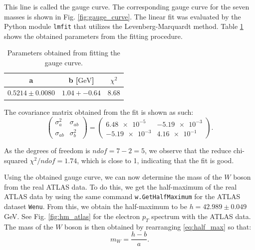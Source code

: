 \documentclass[a4paper]{report}
\numberwithin{equation}{section}
\begin{document}
This line is called the gauge curve. The corresponding gauge curve for the seven masses is shown in Fig. \ref{fig:gauge_curve}. The 
linear fit was evaluated by the Python module \texttt{lmfit} that utilizes the Levenberg-Marquardt method. Table \ref{tab:gauge_params} 
shows the obtained parameters from the fitting procedure.

\begin{table}
    \centering
    \begin{tabular}{|c|c|c|} \hline
    a & b [$\si{\giga\electronvolt}$] &  $\chi^2$  \\ \hline
    $0.5214 \pm 0.0080$ & $1.04 +- 0.64$  & 8.68  \\ \hline
    \end{tabular}
    \caption{Parameters obtained from fitting the gauge curve.}
    \label{tab:gauge_params}
\end{table}

The covariance matrix obtained from the fit is shown as such: 
\begin{equation}
    \begin{pmatrix}
        \sigma_a^2 & \sigma_{ab} \\ 
        \sigma_{ab} & \sigma_b^2 
    \end{pmatrix}
    =
    \begin{pmatrix}
        \num{6.48e-5} & \num{-5.19e-3} \\
        \num{-5.19e-3} & \num{4.16e-1}
    \end{pmatrix} .
    \label{eq:cov_matrix}
\end{equation}

As the degrees of freedom is $ndof = 7 - 2 = 5$, we observe that the reduce chi-squared $\chi^2 / ndof = 1.74$, which is close to 1, 
indicating that the fit is good.\par 

Using the obtained gauge curve, we can now determine the mass of the $W$ boson from the real ATLAS data. To do this, we get the 
half-maximum of the real ATLAS data by using the same command \texttt{w.GetHalfMaximum} for the ATLAS dataset \texttt{Wenu}. From this, 
we obtain the half-maximum to be $h = 42.989 \pm 0.049$ GeV. See Fig. \ref{fig:hm_atlas} for the electron $p_T$ spectrum with the ATLAS data. 
The mass of the $W$ boson is then obtained by rearranging \ref{eq:half_max} so that:
\begin{equation}
    m_W = \frac{h - b}{a}.
\end{equation} 
\end{document}
